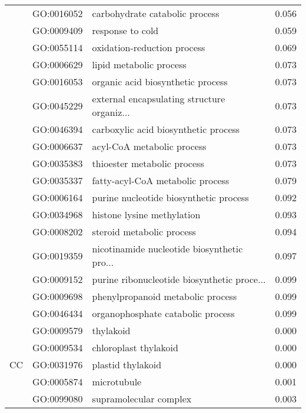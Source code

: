 \begin{longtable}{lllr}
   & GO:0016052 &               carbohydrate catabolic process &         0.056 \\
   & GO:0009409 &                             response to cold &         0.059 \\
   & GO:0055114 &                  oxidation-reduction process &         0.069 \\
   & GO:0006629 &                      lipid metabolic process &         0.073 \\
   & GO:0016053 &            organic acid biosynthetic process &         0.073 \\
   & GO:0045229 &  external encapsulating structure organiz... &         0.073 \\
   & GO:0046394 &         carboxylic acid biosynthetic process &         0.073 \\
   & GO:0006637 &                   acyl-CoA metabolic process &         0.073 \\
   & GO:0035383 &                  thioester metabolic process &         0.073 \\
   & GO:0035337 &             fatty-acyl-CoA metabolic process &         0.079 \\
   & GO:0006164 &       purine nucleotide biosynthetic process &         0.092 \\
   & GO:0034968 &                   histone lysine methylation &         0.093 \\
   & GO:0008202 &                    steroid metabolic process &         0.094 \\
   & GO:0019359 &  nicotinamide nucleotide biosynthetic pro... &         0.097 \\
   & GO:0009152 &  purine ribonucleotide biosynthetic proce... &         0.099 \\
   & GO:0009698 &            phenylpropanoid metabolic process &         0.099 \\
   & GO:0046434 &            organophosphate catabolic process &         0.099 \\
\cline{1-4}
\multirow{18}{*}{CC} & GO:0009579 &                                    thylakoid &         0.000 \\
   & GO:0009534 &                        chloroplast thylakoid &         0.000 \\
   & GO:0031976 &                            plastid thylakoid &         0.000 \\
   & GO:0005874 &                                  microtubule &         0.001 \\
   & GO:0099080 &                       supramolecular complex &         0.003 \\

\end{longtable}
